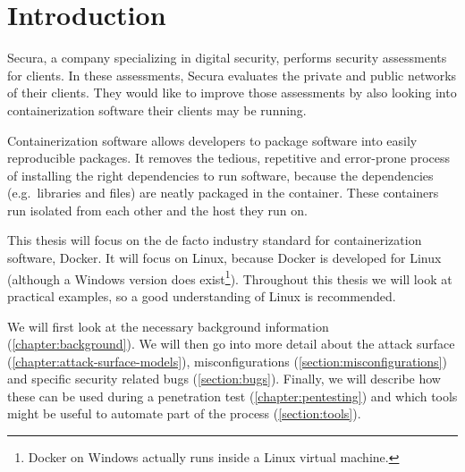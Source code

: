 \chapter{Introduction}
Secura, a company specializing in digital security, performs security assessments for clients. In these assessments, Secura evaluates the private and public networks of their clients. They would like to improve those assessments by also looking into containerization software their clients may be running.

\medskip

Containerization software allows developers to package software into easily reproducible packages. It removes the tedious, repetitive and error-prone process of installing the right dependencies to run software, because the dependencies (e.g.\ libraries and files) are neatly packaged in the container. These containers run isolated from each other and the host they run on.

\medskip

This thesis will focus on the de facto industry standard for containerization software, Docker. It will focus on Linux, because Docker is developed for Linux (although a Windows version does exist\footnote{Docker on Windows actually runs inside a Linux virtual machine.}). Throughout this thesis we will look at practical examples, so a good understanding of Linux is recommended.

\medskip

We will first look at the necessary background information (\autoref{chapter:background}). We will then go into more detail about the attack surface (\autoref{chapter:attack-surface-models}), misconfigurations (\autoref{section:misconfigurations}) and specific security related bugs (\autoref{section:bugs}). Finally, we will describe how these can be used during a penetration test (\autoref{chapter:pentesting}) and which tools might be useful to automate part of the process (\autoref{section:tools}).
